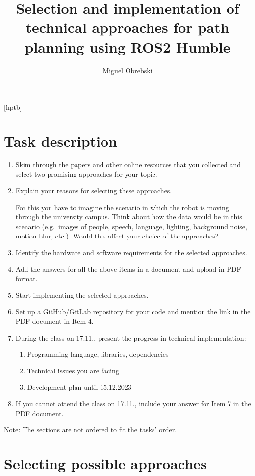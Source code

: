 \documentclass[11pt,a4paper]{article}
\title{Selection and implementation of technical approaches for path planning using ROS2 Humble}
\author{Miguel Obrebski}
\date{} %
\begin{document}
[hptb]

\maketitle


\section{Task description}
\begin{enumerate}
    \item Skim through the papers and other online resources that you collected and select two promising approaches for your topic.
    \item Explain your reasons for selecting these approaches.

          For this you have to imagine the scenario in which the robot is moving through the university campus. Think about how the data would be in this scenario (e.g.\
          images of people, speech, language, lighting, background noise, motion blur, etc.). Would this affect your choice of the approaches?
    \item Identify the hardware and software requirements for the selected approaches.
    \item Add the answers for all the above items in a document and upload in PDF format.
    \item Start implementing the selected approaches.
    \item Set up a GitHub/GitLab repository for your code and mention the link in the PDF document in Item 4.
    \item During the class on 17.11., present the progress in technical implementation:

          \begin{enumerate}
              \item Programming language, libraries, dependencies
              \item Technical issues you are facing
              \item Development plan until 15.12.2023
          \end{enumerate}
    \item If you cannot attend the class on 17.11., include your answer for Item 7 in the PDF document.
\end{enumerate}
Note: The sections are not ordered to fit the tasks' order.


\section{Selecting possible approaches}
\end{document}
